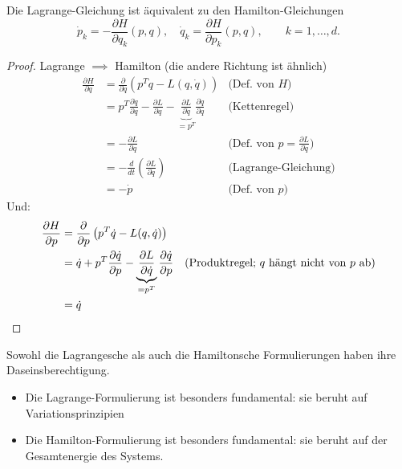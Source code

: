 \begin{satz}
  Die Lagrange-Gleichung ist äquivalent zu den Hamilton-Gleichungen
  \begin{equation*}
    \dot p_k = -\frac{\partial H}{\partial q_k}(p, q),
    \quad
    \dot q_k = \frac{\partial H}{\partial p_k}(p, q),
    \qquad
    k = 1, \dots, d.
  \end{equation*}
\end{satz}

\begin{proof}
  Lagrange $\implies$ Hamilton (die andere Richtung ist ähnlich)
  \begin{align*}
    \frac{\partial H}{\partial q}
    & = \frac\partial{\partial q}\left( p^T \dot q - L(q, \dot q) \right) & \text{(Def. von $H$)} \\
    & = p^T \frac{\partial \dot q}{\partial q} - \frac{\partial L}{\partial q} - \underbrace{\frac{\partial L}{\partial \dot q}}_{= p^T} \frac{\partial \dot q}{\partial q} & \text{(Kettenregel)} \\
    & = - \frac{\partial L}{\partial q} & \text{(Def. von $p = \frac{\partial L}{\partial \dot q}$)} \\
    & = - \frac{d}{dt}\left( \frac{\partial L}{\partial \dot q} \right) & \text{(Lagrange-Gleichung)} \\
    & = - \dot p & \text{(Def. von $p$)}
  \end{align*}
  Und:
  \begin{align*}
    \frac{\partial H}{\partial p}
    & = \frac{\partial}{\partial p}\left( p^T \dot q - L(q, \dot q) \right) \\
    & = \dot q + p^T \frac{\partial \dot q}{\partial p} - \underbrace{\frac{\partial L}{\partial \dot q}}_{=p^T} \frac{\partial \dot q}{\partial p} & \text{(Produktregel; $q$ hängt nicht von $p$ ab)} \\
    & = \dot q \qedhere
  \end{align*}
\end{proof}

Sowohl die Lagrangesche als auch die Hamiltonsche Formulierungen haben ihre Daseinsberechtigung.
\begin{itemize}
\item Die Lagrange-Formulierung ist besonders fundamental: sie beruht auf Variationsprinzipien
\item Die Hamilton-Formulierung ist besonders fundamental: sie beruht auf der Gesamtenergie des Systems.
\end{itemize}

